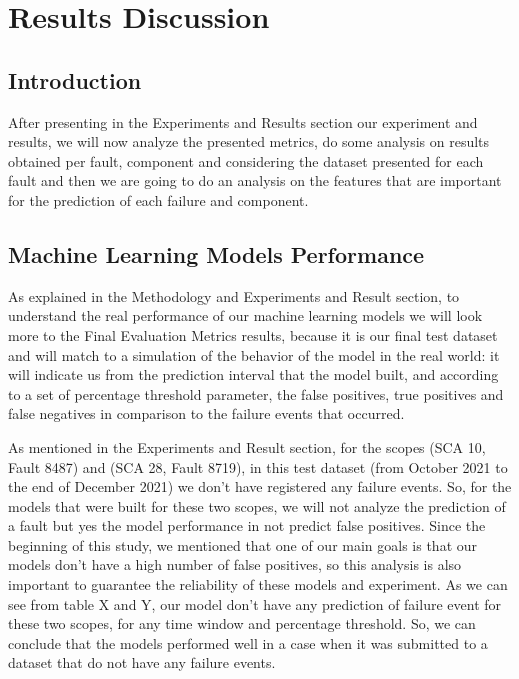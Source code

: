 

\chapter{Results Discussion}
\label{cha:Results Discussion}

\section{Introduction} 
\label{sub:Results Discussion/Introduction}
After presenting in the Experiments and Results section our experiment and results, we will now analyze the presented metrics, do some analysis on results obtained per fault, component and considering the dataset presented for each fault and then we are going to do an analysis on the features that are important for the prediction of each failure and component.

\section{Machine Learning Models Performance}
As explained in the Methodology and Experiments and Result section, to understand the real performance of our machine learning models we will look more to the Final Evaluation Metrics results, because it is our final test dataset and will match to a simulation of the behavior of the model in the real world: it will indicate us from the prediction interval that the model built, and according to a set of percentage threshold parameter, the false positives, true positives and false negatives in comparison to the failure events that occurred.

As mentioned in the Experiments and Result section, for the scopes (SCA 10, Fault 8487) and (SCA 28, Fault 8719), in this test dataset (from October 2021 to the end of December 2021) we don't have registered any failure events. So, for the models that were built for these two scopes, we will not analyze the prediction of a fault but yes the model performance in not predict false positives. Since the beginning of this study, we mentioned that one of our main goals is that our models don't have a high number of false positives, so this analysis is also important to guarantee the reliability of these models and experiment. As we can see from table X and Y, our model don't have any prediction of failure event for these two scopes, for any time window and percentage threshold. So, we can conclude that the models performed well in a case when it was submitted to a dataset that do not have any failure events.

